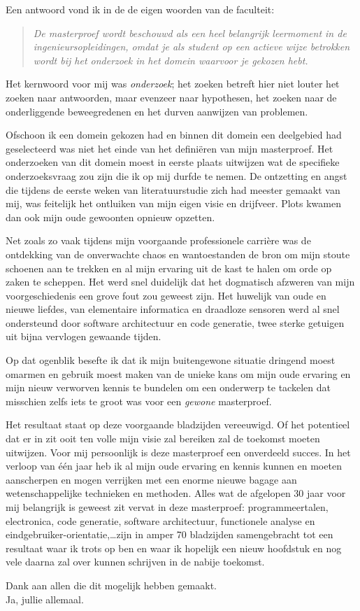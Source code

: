 Een antwoord vond ik in de de eigen woorden van de faculteit:
\begin{quote}
\emph{De masterproef wordt beschouwd als een heel belangrijk leermoment in de
ingenieursopleidingen, omdat je als student op een actieve wijze betrokken
wordt bij het onderzoek in het domein waarvoor je gekozen hebt.}
\end{quote}

Het kernwoord voor mij was \emph{onderzoek}; het zoeken betreft hier niet
louter het zoeken naar antwoorden, maar evenzeer naar hypothesen, het zoeken
naar de onderliggende beweegredenen en het durven aanwijzen van problemen.

Ofschoon ik een domein gekozen had en binnen dit domein een deelgebied had
geselecteerd was niet het einde van het defini\"eren van mijn masterproef. Het
onderzoeken van dit domein moest in eerste plaats uitwijzen wat de specifieke
onderzoeksvraag zou zijn die ik op mij durfde te nemen. De ontzetting en angst
die tijdens de eerste weken van literatuurstudie zich had meester gemaakt van
mij, was feitelijk het ontluiken van mijn eigen visie en drijfveer. Plots
kwamen dan ook mijn oude gewoonten opnieuw opzetten.

Net zoals zo vaak tijdens mijn voorgaande professionele carri\`ere was de
ontdekking van de onverwachte chaos en wantoestanden de bron om mijn stoute
schoenen aan te trekken en al mijn ervaring uit de kast te halen om orde op
zaken te scheppen. Het werd snel duidelijk dat het dogmatisch afzweren van mijn
voorgeschiedenis een grove fout zou geweest zijn. Het huwelijk van oude en
nieuwe liefdes, van elementaire informatica en draadloze sensoren werd al snel
ondersteund door software architectuur en code generatie, twee sterke getuigen
uit bijna vervlogen gewaande tijden.

Op dat ogenblik besefte ik dat ik mijn buitengewone situatie dringend moest
omarmen en gebruik moest maken van de unieke kans om mijn oude ervaring en mijn
nieuw verworven kennis te bundelen om een onderwerp te tackelen dat misschien
zelfs iets te groot was voor een \emph{gewone} masterproef.

Het resultaat staat op deze voorgaande bladzijden vereeuwigd. Of het potentieel
dat er in zit ooit ten volle mijn visie zal bereiken zal de toekomst moeten
uitwijzen. Voor mij persoonlijk is deze masterproef een onverdeeld succes. In
het verloop van \'e\'en jaar heb ik al mijn oude ervaring en kennis kunnen en
moeten aanscherpen en mogen verrijken met een enorme nieuwe bagage aan
wetenschappelijke technieken en methoden. Alles wat de afgelopen 30 jaar voor
mij belangrijk is geweest zit vervat in deze masterproef: programmeertalen,
electronica, code generatie, software architectuur, functionele analyse en
eindgebruiker-orientatie,\dots zijn in amper 70 bladzijden samengebracht tot
een resultaat waar ik trots op ben en waar ik hopelijk een nieuw hoofdstuk en
nog vele daarna zal over kunnen schrijven in de nabije toekomst.

\bigskip

Dank aan allen die dit mogelijk hebben gemaakt.\\
Ja, jullie allemaal.
